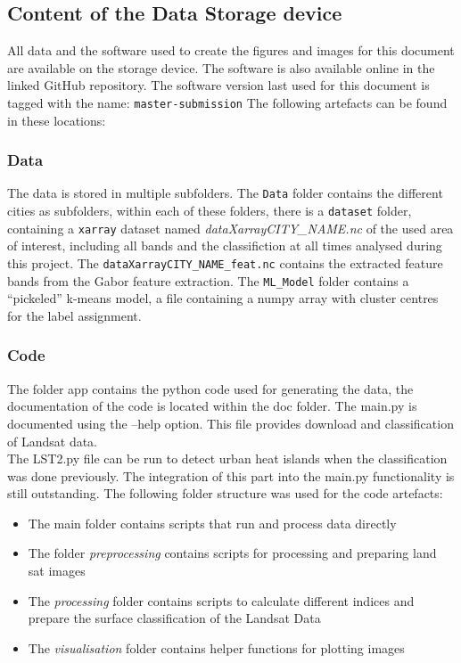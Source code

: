 \documentclass[12pt,a4paper, english,twoside]{scrartcl}
\begin{document}
  \missingfigure{}
  \subsection{Content of the Data Storage device}
    All data and the software used to create the figures and images for this document are available on the storage device.
    The software is also available online in the linked GitHub repository.
    The software version last used for this document is tagged with the name: \texttt{master-submission}
    The following artefacts can be found in these locations:
  \subsubsection{Data}
    The data is stored in multiple subfolders. 
    The \texttt{Data} folder contains the different cities as subfolders, within each of these folders, there is a \texttt{dataset} folder, containing a \texttt{xarray} dataset named \textit{dataXarrayCITY\_NAME.nc} of the used area of interest, including all bands and the classifiction at all times analysed during this project. 
    The \texttt{dataXarrayCITY\_NAME\_feat.nc} contains the extracted feature bands from the Gabor feature extraction.
    The \texttt{ML\_Model} folder contains a ``pickeled'' k-means model, a file containing a numpy array with cluster centres for the label assignment. 
  \subsubsection{Code}\label{sec:code}
      The folder app contains the python code used for generating the data, the documentation of the code is located within the doc folder.
      The main.py is documented using the --help option. This file provides download and classification of Landsat data.\\ 
      The LST2.py file can be run to detect urban heat islands when the classification was done previously. 
      The integration of this part into the main.py functionality is still outstanding. 
      The following folder structure was used for the code artefacts:
      \begin{itemize}
        \item The main folder contains scripts that run and process data directly
        \item The folder \textit{preprocessing} contains scripts for processing and preparing land sat images
        \item The \textit{processing} folder contains scripts to calculate different indices and prepare the surface classification of the Landsat Data
        \item The \textit{visualisation} folder contains helper functions for plotting images 
      \end{itemize}
\newpage
\printbibliography%
\newpage
{}
\end{document}
